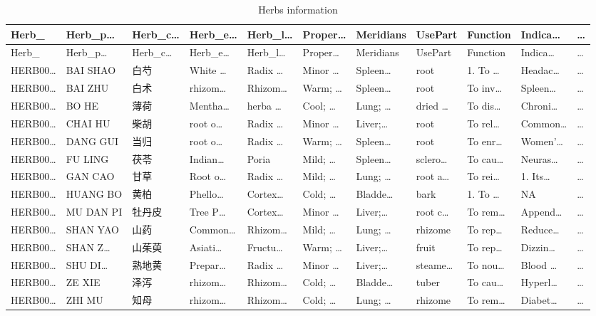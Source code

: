 \documentclass[
]{article}
\begin{document}
\begin{longtable}[]{@{}lllllllllll@{}}
\caption{\label{tab:Herbs-information}Herbs information}\tabularnewline
\toprule
Herb\_ & Herb\_p\ldots{} & Herb\_c\ldots{} & Herb\_e\ldots{} & Herb\_l\ldots{} & Proper\ldots{} & Meridians & UsePart & Function & Indica\ldots{} & \ldots{}\tabularnewline
\midrule
\endfirsthead
\toprule
Herb\_ & Herb\_p\ldots{} & Herb\_c\ldots{} & Herb\_e\ldots{} & Herb\_l\ldots{} & Proper\ldots{} & Meridians & UsePart & Function & Indica\ldots{} & \ldots{}\tabularnewline
\midrule
\endhead
HERB00\ldots{} & BAI SHAO & 白芍 & White \ldots{} & Radix \ldots{} & Minor \ldots{} & Spleen\ldots{} & root & 1. To \ldots{} & Headac\ldots{} & \ldots{}\tabularnewline
HERB00\ldots{} & BAI ZHU & 白术 & rhizom\ldots{} & Rhizom\ldots{} & Warm; \ldots{} & Spleen\ldots{} & root & To inv\ldots{} & Spleen\ldots{} & \ldots{}\tabularnewline
HERB00\ldots{} & BO HE & 薄荷 & Mentha\ldots{} & herba \ldots{} & Cool; \ldots{} & Lung; \ldots{} & dried \ldots{} & To dis\ldots{} & Chroni\ldots{} & \ldots{}\tabularnewline
HERB00\ldots{} & CHAI HU & 柴胡 & root o\ldots{} & Radix \ldots{} & Minor \ldots{} & Liver;\ldots{} & root & To rel\ldots{} & Common\ldots{} & \ldots{}\tabularnewline
HERB00\ldots{} & DANG GUI & 当归 & root o\ldots{} & Radix \ldots{} & Warm; \ldots{} & Spleen\ldots{} & root & To enr\ldots{} & Women'\ldots{} & \ldots{}\tabularnewline
HERB00\ldots{} & FU LING & 茯苓 & Indian\ldots{} & Poria & Mild; \ldots{} & Spleen\ldots{} & sclero\ldots{} & To cau\ldots{} & Neuras\ldots{} & \ldots{}\tabularnewline
HERB00\ldots{} & GAN CAO & 甘草 & Root o\ldots{} & Radix \ldots{} & Mild; \ldots{} & Lung; \ldots{} & root a\ldots{} & To rei\ldots{} & 1. Its\ldots{} & \ldots{}\tabularnewline
HERB00\ldots{} & HUANG BO & 黄柏 & Phello\ldots{} & Cortex\ldots{} & Cold; \ldots{} & Bladde\ldots{} & bark & 1. To \ldots{} & NA & \ldots{}\tabularnewline
HERB00\ldots{} & MU DAN PI & 牡丹皮 & Tree P\ldots{} & Cortex\ldots{} & Minor \ldots{} & Liver;\ldots{} & root c\ldots{} & To rem\ldots{} & Append\ldots{} & \ldots{}\tabularnewline
HERB00\ldots{} & SHAN YAO & 山药 & Common\ldots{} & Rhizom\ldots{} & Mild; \ldots{} & Lung; \ldots{} & rhizome & To rep\ldots{} & Reduce\ldots{} & \ldots{}\tabularnewline
HERB00\ldots{} & SHAN Z\ldots{} & 山茱萸 & Asiati\ldots{} & Fructu\ldots{} & Warm; \ldots{} & Liver;\ldots{} & fruit & To rep\ldots{} & Dizzin\ldots{} & \ldots{}\tabularnewline
HERB00\ldots{} & SHU DI\ldots{} & 熟地黄 & Prepar\ldots{} & Radix \ldots{} & Minor \ldots{} & Liver;\ldots{} & steame\ldots{} & To nou\ldots{} & Blood \ldots{} & \ldots{}\tabularnewline
HERB00\ldots{} & ZE XIE & 泽泻 & rhizom\ldots{} & Rhizom\ldots{} & Cold; \ldots{} & Bladde\ldots{} & tuber & To cau\ldots{} & Hyperl\ldots{} & \ldots{}\tabularnewline
HERB00\ldots{} & ZHI MU & 知母 & rhizom\ldots{} & Rhizom\ldots{} & Cold; \ldots{} & Lung; \ldots{} & rhizome & To rem\ldots{} & Diabet\ldots{} & \ldots{}\tabularnewline
\bottomrule
\end{longtable}
\end{document}
